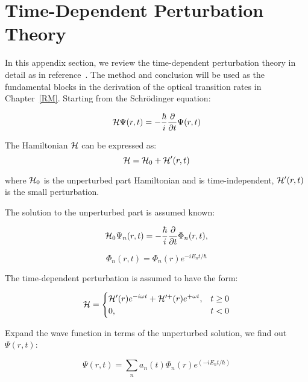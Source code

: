 \chapter{Time-Dependent Perturbation Theory} \label{ch:rates} 

In this appendix section, we review the time-dependent perturbation theory in
detail as in reference~\cite{Chuang:2009tx}. The method and conclusion will be
used as the fundamental blocks in the derivation of the optical transition
rates in Chapter~\ref{RM}. Starting from the Schr{\"o}dinger equation:

\begin{equation}
  \mathcal{H}\Psi(r,t) = - \frac{\hbar}{i}\frac{\partial}{\partial t}\Psi(r,t)
\end{equation}

The Hamiltonian $\mathcal{H}$ can be expressed as:
\begin{equation}
  \mathcal{H} = \mathcal{H}_0 + \mathcal{H}^\prime(r,t)
\end{equation}

where $\mathcal{H}_0$ is the unperturbed part Hamiltonian and is time-independent,
$\mathcal{H}^\prime(r,t)$ is the small perturbation.

The solution to the unperturbed part is assumed known:

\begin{equation}
  \HAM_0\Psi_n(r,t) = - \frac{\hbar}{i}\frac{\partial }{\partial t}\Phi_n(r,t),
\label{eq:unperturbHAM}
\end{equation}

\begin{equation}
  \Phi_n(r,t)=\Phi_n(r)e^{-iE_nt/\hbar}
\end{equation}

The time-dependent perturbation is assumed to have the form:

\begin{equation}
  \mathcal{H} = \begin{cases}
    \mathcal{H}^\prime(r)e^{-i\omega t} + \mathcal{H}^{\prime+}(r)e^{+\omega t}, & t \geq 0 \\
    0, & t < 0
  \end{cases}
\end{equation}

Expand the wave function in terms of the unperturbed solution, we find out
$\Psi(r,t)$:

\begin{equation}
  \Psi(r,t) = \sum_{n}a_n(t)\Phi_n(r)e^{(-iE_{n}t/\hbar)}
\end{equation}

